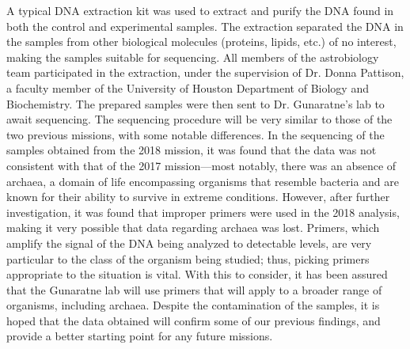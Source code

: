A typical DNA extraction kit was used to extract and purify the DNA found in both the control and experimental samples. The extraction separated the DNA in the samples from other biological molecules (proteins, lipids, etc.) of no interest, making the samples suitable for sequencing. All members of the astrobiology team participated in the extraction, under the supervision of Dr. Donna Pattison, a faculty member of the University of Houston Department of Biology and Biochemistry. The prepared samples were then sent to Dr. Gunaratne’s lab to await sequencing. The sequencing procedure will be very similar to those of the two previous missions, with some notable differences. In the sequencing of the samples obtained from the 2018 mission, it was found that the data was not consistent with that of the 2017 mission—most notably, there was an absence of archaea, a domain of life encompassing organisms that resemble bacteria and are known for their ability to survive in extreme conditions. However, after further investigation, it was found that improper primers were used in the 2018 analysis, making it very possible that data regarding archaea was lost. Primers, which amplify the signal of the DNA being analyzed to detectable levels, are very particular to the class of the organism being studied; thus, picking primers appropriate to the situation is vital. With this to consider, it has been assured that the Gunaratne lab will use primers that will apply to a broader range of organisms, including archaea. Despite the contamination of the samples, it is hoped that the data obtained will confirm some of our previous findings, and provide a better starting point for any future missions. 
